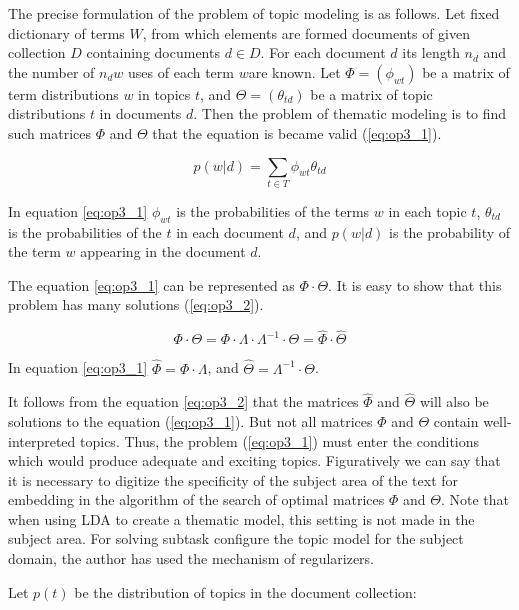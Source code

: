 \documentclass[12pt]{report}
\theoremstyle{definition}
\begin{document}
The precise formulation of the problem of topic modeling is as follows. 
Let fixed dictionary of terms $W$, from which elements are formed documents of given collection $ D $ containing documents $d \in D$. 
For each document $d$ its length $n_d$ and the number of $n_dw$ uses of each term $w$are known.
Let $\Phi=(\phi_{wt})$ be a matrix of term distributions $w$ in topics $t$, and $\Theta=(\theta_{td})$ be a matrix of topic distributions $t$ in documents $d$. 
Then the problem of thematic modeling is to find such matrices $\Phi$ and $\Theta$ that the equation is became valid (\ref{eq:op3_1}).

\begin{equation} 
\label{eq:op3_1}
p ( w \vert d ) = \sum_{t \in T} \phi_{wt} \theta_{td}
\end{equation}

In equation \ref{eq:op3_1} $ \phi_{wt} $ is the probabilities of the terms $w$ in each topic $t$, $\theta_{td}$ is the probabilities of the $t$ in each document $d$, and $ p ( w \vert d) $ is the probability of the term $w$ appearing in the document $d$.

The equation \ref{eq:op3_1} can be represented as $ \Phi \cdot \Theta $. 
It is easy to show that this problem has many solutions (\ref{eq:op3_2}).

\begin{equation} 
\label{eq:op3_2}
\Phi \cdot \Theta  = \Phi \cdot \Lambda \cdot \Lambda^{-1} \cdot \Theta = \hat{\Phi} \cdot \hat{\Theta}
\end{equation}

In equation \ref{eq:op3_1} $\hat{\Phi} = \Phi \cdot \Lambda $, and  $\hat{\Theta} = \Lambda^{-1} \cdot \Theta$.

It follows from the equation \ref{eq:op3_2} that the matrices $\hat{\Phi}$ and $\hat{\Theta}$ will also be solutions to the equation (\ref{eq:op3_1}).
But not all matrices $\Phi$ and $\Theta$  contain well-interpreted topics. 
Thus, the problem (\ref{eq:op3_1}) must enter the conditions which would produce adequate and exciting topics. 
Figuratively we can say that it is necessary to digitize the specificity of the subject area of the text for embedding in the algorithm of the search of optimal matrices $\Phi$ and $\Theta$. 
Note that when using LDA to create a thematic model, this setting is not made in the subject area.
For solving subtask configure the topic model for the subject domain, the author has used the mechanism of regularizers.

Let $p \left( t \right) $ be the distribution of topics in the document collection:
\end{document}
